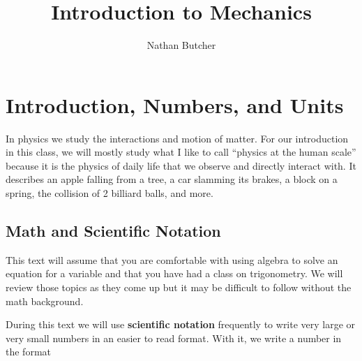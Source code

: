 \documentclass[12pt]{book}
\title{Introduction to Mechanics}
\author{Nathan Butcher}
\begin{document}
\graphicspath{{Figures/Units} {Figures/Forces} {Figures/WorkEnergy} {Figures/Momentum} {Figures/Rotation} {Figures/SolarSystem}}
\setcounter{chp}{0}

\newcommand{\scinot}[2]{#1 \cdot 10^{#2}}

\newcommand{\example}{\textbf{Example \texttt{\thechp}.\texttt{\theexample}}
\addtocounter{example}{1}

\hspace{10pt}
}

\newcommand{\linespace}{\hspace{10pt}

\hrule

\hspace{10pt}}

\newenvironment{exampleblock}
{
\linespace

\example

}
{

\linespace

}

\tableofcontents

\chapter{Introduction, Numbers, and Units}

\setcounter{example}{1}
\addtocounter{chp}{1}

In physics we study the interactions and motion of matter. For our introduction in this class, we will mostly study what I like to call ``physics at the human scale'' because it is the physics of daily life that we observe and directly interact with. It describes an apple falling from a tree, a car slamming its brakes, a block on a spring, the collision of 2 billiard balls, and more.

\section{Math and Scientific Notation}

This text will assume that you are comfortable with using algebra to solve an equation for a variable and that you have had a class on trigonometry. We will review those topics as they come up but it may be difficult to follow without the math background.

During this text we will use \textbf{scientific notation} frequently to write very large or very small numbers in an easier to read format. With it, we write a number in the format
\end{document}
